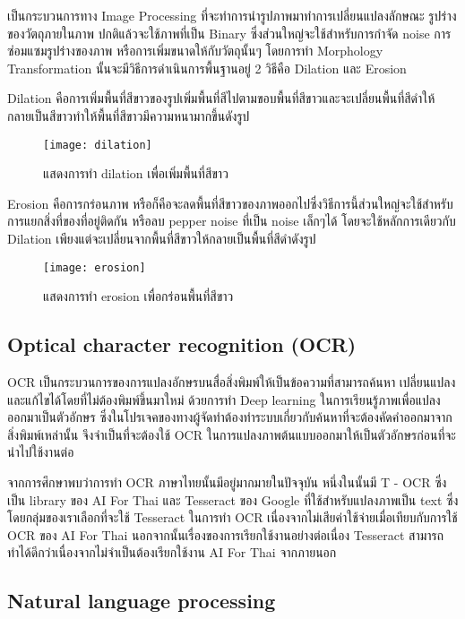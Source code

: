 เป็นกระบวนการทาง Image Processing  ที่จะทำการนำรูปภาพมาทำการเปลี่ยนแปลงลักษณะ รูปร่างของวัตถุภายในภาพ ปกติแล้วจะใช้ภาพที่เป็น Binary ซึ่งส่วนใหญ่จะใช้สำหรับการกำจัด noise การซ่อมแซมรูปร่างของภาพ หรือการเพิ่มขนาดให้กับวัตถุนั้นๆ โดยการทำ Morphology Transformation นั้นจะมีวิธีการดำเนินการพื้นฐานอยู่ 2 วิธีคือ Dilation และ Erosion

Dilation คือการเพิ่มพื้นที่สีขาวของรูปเพิ่มพื้นที่สีไปตามขอบพื้นที่สีขาวและจะเปลี่ยนพื้นที่สีดำให้กลายเป็นสีขาวทำให้พื้นที่สีขาวมีความหนามากขึ้นดังรูป 

\begin{figure}[H]
    \centering
    \texttt{[image: dilation]}
    \caption{แสดงการทำ dilation เพื่อเพิ่มพื้นที่สีขาว}\label{fig:Dilation}
\end{figure}

Erosion คือการกร่อนภาพ หรือก็คือจะลดพื้นที่สีขาวของภาพออกไปซึ่งวิธีการนี้ส่วนใหญ่จะใช้สำหรับการแยกสิ่งที่ของที่อยู่ติดกัน หรือลบ pepper noise ที่เป็น noise เล็กๆได้ โดยจะใช้หลักการเดียวกับ Dilation เพียงแต่จะเปลี่ยนจากพื้นที่สีขาวให้กลายเป็นพื้นที่สีดำดังรูป

\begin{figure}[H]
    \centering
    \texttt{[image: erosion]}
    \caption{แสดงการทำ erosion เพื่อกร่อนพื้นที่สีขาว}\label{fig:Erosion}
\end{figure}

\subsection{Optical character recognition (OCR)}

OCR เป็นกระบวนการของการแปลงอักษรบนสื่อสิ่งพิมพ์ให้เป็นข้อความที่สามารถค้นหา เปลี่ยนแปลงและแก้ไขได้โดยที่ไม่ต้องพิมพ์ขึ้นมาใหม่ ด้วยการทำ Deep learning ในการเรียนรู้ภาพเพื่อแปลงออกมาเป็นตัวอักษร ซึ่งในโปรเจคของทางผู้จัดทำต้องทำระบบเกี่ยวกับค้นหาที่จะต้องคัดคำออกมาจากสิ่งพิมพ์เหล่านั้น จึงจำเป็นที่จะต้องใช้ OCR ในการแปลงภาพต้นแบบออกมาให้เป็นตัวอักษรก่อนที่จะนำไปใช้งานต่อ

จากการศึกษาพบว่าการทำ OCR ภาษาไทยนั้นมีอยู่มากมายในปัจจุบัน หนึ่งในนั้นมี T - OCR ซึ่งเป็น library ของ AI For Thai \cite{nectec} และ Tesseract ของ Google \cite{google} ที่ใช้สำหรับแปลงภาพเป็น text ซึ่งโดยกลุ่มของเราเลือกที่จะใช้ Tesseract ในการทำ OCR เนื่องจากไม่เสียค่าใช้จ่ายเมื่อเทียบกับการใช้ OCR ของ AI For Thai นอกจากนั้นเรื่องของการเรียกใช้งานอย่างต่อเนื่อง Tesseract สามารถทำได้ดีกว่าเนื่องจากไม่จำเป็นต้องเรียกใช้งาน AI For Thai จากภายนอก

\subsection{Natural language processing}

